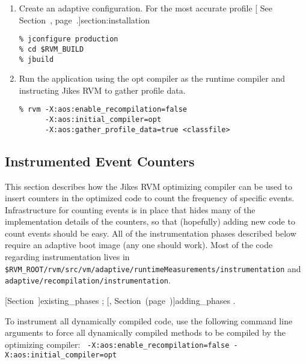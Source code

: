 \begin{enumerate}
\item Create an adaptive configuration.  For the most accurate profile
[  See Section~\Ref, page~\Pageref.]{section:installation}
\begin{verbatim}
% jconfigure production
% cd $RVM_BUILD
% jbuild
\end{verbatim}

\item Run the application using the opt compiler as the runtime compiler and
instructing Jikes RVM to gather profile data.
\begin{verbatim}
% rvm -X:aos:enable_recompilation=false 
      -X:aos:initial_compiler=opt 
      -X:aos:gather_profile_data=true <classfile>
\end{verbatim}
\end{enumerate}

\subsection{Instrumented Event Counters}
\label{counting_events}
This section describes how the Jikes RVM optimizing compiler can be
used to insert counters in the optimized code to count the frequency
of specific events.  Infrastructure for counting events is in place
that hides many of the implementation details of the counters, so that
(hopefully) adding new code to count events should be easy.  All of
the instrumentation phases described below require an adaptive boot
image (any one should work).  Most of the code regarding
instrumentation lives in {\tt
\$RVM\_\-ROOT/rvm/src/vm/adaptive/runtimeMeasurements/instrumentation} and {\tt
adaptive/recompilation/instrumentation}.

[Section~\Ref]{existing_phases} ; [, Section~\Ref (page~\Pageref)]{adding_phases}
.

To instrument all dynamically compiled code, use the following command
line arguments to force all dynamically compiled methods to be
compiled by the optimizing compiler: {\tt
-X:aos:en\-a\-ble\_re\-com\-pi\-la\-tion=false -X:aos:i\-ni\-tial\_com\-pi\-ler=opt}

